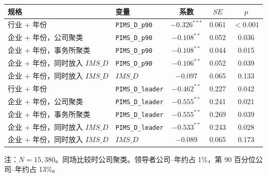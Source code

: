 \documentclass[11pt]{article}
\begin{document}
\begin{center}
\begin{threeparttable}
\caption{二元合伙人规则}
\label{tab:p-bin}
\begin{tabular}{llccc}
\toprule
规格 & 变量 & 系数 & \(SE\) & \(p\) \\
\midrule
行业 + 年份 & \texttt{PIMS\_D\_p90} & \(-0.326^{***}\) & 0.061 & \(<0.001\) \\
企业 + 年份，公司聚类 & \texttt{PIMS\_D\_p90} & \(-0.108^{**}\) & 0.052 & 0.036 \\
企业 + 年份，事务所聚类 & \texttt{PIMS\_D\_p90} & \(-0.108^{**}\) & 0.044 & 0.015 \\
企业 + 年份，同时放入 \(IMS\_D\) & \texttt{PIMS\_D\_p90} & \(-0.106^{**}\) & 0.052 & 0.039 \\
企业 + 年份，同时放入 \(IMS\_D\) & \(IMS\_D\) & \(-0.097\) & 0.065 & 0.133 \\
\midrule
行业 + 年份 & \texttt{PIMS\_D\_leader} & \(-0.462^{**}\) & 0.227 & 0.042 \\
企业 + 年份，公司聚类 & \texttt{PIMS\_D\_leader} & \(-0.555^{**}\) & 0.241 & 0.021 \\
企业 + 年份，事务所聚类 & \texttt{PIMS\_D\_leader} & \(-0.555^{**}\) & 0.269 & 0.039 \\
企业 + 年份，同时放入 \(IMS\_D\) & \texttt{PIMS\_D\_leader} & \(-0.533^{**}\) & 0.243 & 0.028 \\
企业 + 年份，同时放入 \(IMS\_D\) & \(IMS\_D\) & \(-0.089\) & 0.065 & 0.173 \\
\bottomrule
\end{tabular}
\begin{tablenotes}\footnotesize
\item 注：\(N=15{,}380\)。同场比较时公司聚类。领导者公司--年约占 1\%，第 90 百分位公司--年约占 13\%。
\end{tablenotes}
\end{threeparttable}
\end{center}
\end{document}
